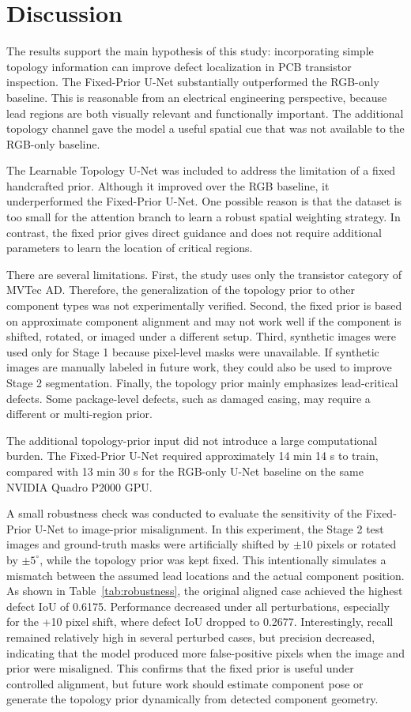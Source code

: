 \documentclass[conference,a4paper]{IEEEtran}
\begin{document}
\section{Discussion}

The results support the main hypothesis of this study: incorporating simple topology information can improve defect localization in PCB transistor inspection. The Fixed-Prior U-Net substantially outperformed the RGB-only baseline. This is reasonable from an electrical engineering perspective, because lead regions are both visually relevant and functionally important. The additional topology channel gave the model a useful spatial cue that was not available to the RGB-only baseline.

The Learnable Topology U-Net was included to address the limitation of a fixed handcrafted prior. Although it improved over the RGB baseline, it underperformed the Fixed-Prior U-Net. One possible reason is that the dataset is too small for the attention branch to learn a robust spatial weighting strategy. In contrast, the fixed prior gives direct guidance and does not require additional parameters to learn the location of critical regions.

There are several limitations. First, the study uses only the transistor category of MVTec AD. Therefore, the generalization of the topology prior to other component types was not experimentally verified. Second, the fixed prior is based on approximate component alignment and may not work well if the component is shifted, rotated, or imaged under a different setup. Third, synthetic images were used only for Stage 1 because pixel-level masks were unavailable. If synthetic images are manually labeled in future work, they could also be used to improve Stage 2 segmentation. Finally, the topology prior mainly emphasizes lead-critical defects. Some package-level defects, such as damaged casing, may require a different or multi-region prior.

The additional topology-prior input did not introduce a large computational burden. The Fixed-Prior U-Net required approximately 14 min 14 s to train, compared with 13 min 30 s for the RGB-only U-Net baseline on the same NVIDIA Quadro P2000 GPU.

A small robustness check was conducted to evaluate the sensitivity of the Fixed-Prior U-Net to image-prior misalignment. In this experiment, the Stage 2 test images and ground-truth masks were artificially shifted by $\pm 10$ pixels or rotated by $\pm 5^\circ$, while the topology prior was kept fixed. This intentionally simulates a mismatch between the assumed lead locations and the actual component position. As shown in Table~\ref{tab:robustness}, the original aligned case achieved the highest defect IoU of 0.6175. Performance decreased under all perturbations, especially for the +10 pixel shift, where defect IoU dropped to 0.2677. Interestingly, recall remained relatively high in several perturbed cases, but precision decreased, indicating that the model produced more false-positive pixels when the image and prior were misaligned. This confirms that the fixed prior is useful under controlled alignment, but future work should estimate component pose or generate the topology prior dynamically from detected component geometry.
\end{document}
